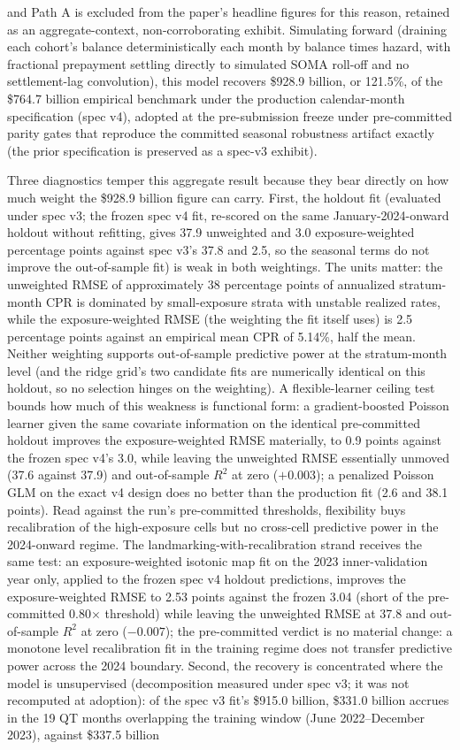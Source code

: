 \documentclass[12pt]{article}
\begin{document}
and Path A is excluded from the paper's headline figures for this reason, retained as an aggregate-context, non-corroborating exhibit. Simulating forward (draining each cohort's balance deterministically each month by balance times hazard, with fractional prepayment settling directly to simulated SOMA roll-off and no settlement-lag convolution), this model recovers \$928.9 billion, or 121.5\%, of the \$764.7 billion empirical benchmark under the production calendar-month specification (spec v4), adopted at the pre-submission freeze under pre-committed parity gates that reproduce the committed seasonal robustness artifact exactly (the prior specification is preserved as a spec-v3 exhibit).

Three diagnostics temper this aggregate result because they bear directly on how much weight the \$928.9 billion figure can carry. First, the holdout fit (evaluated under spec v3; the frozen spec v4 fit, re-scored on the same January-2024-onward holdout without refitting, gives 37.9 unweighted and 3.0 exposure-weighted percentage points against spec v3's 37.8 and 2.5, so the seasonal terms do not improve the out-of-sample fit) is weak in both weightings. The units matter: the unweighted RMSE of approximately 38 percentage points of annualized stratum-month CPR is dominated by small-exposure strata with unstable realized rates, while the exposure-weighted RMSE (the weighting the fit itself uses) is 2.5 percentage points against an empirical mean CPR of 5.14\%, half the mean. Neither weighting supports out-of-sample predictive power at the stratum-month level (and the ridge grid's two candidate fits are numerically identical on this holdout, so no selection hinges on the weighting). A flexible-learner ceiling test bounds how much of this weakness is functional form: a gradient-boosted Poisson learner given the same covariate information on the identical pre-committed holdout improves the exposure-weighted RMSE materially, to 0.9 points against the frozen spec v4's 3.0, while leaving the unweighted RMSE essentially unmoved (37.6 against 37.9) and out-of-sample $R^2$ at zero ($+0.003$); a penalized Poisson GLM on the exact v4 design does no better than the production fit (2.6 and 38.1 points). Read against the run's pre-committed thresholds, flexibility buys recalibration of the high-exposure cells but no cross-cell predictive power in the 2024-onward regime. The landmarking-with-recalibration strand receives the same test: an exposure-weighted isotonic map fit on the 2023 inner-validation year only, applied to the frozen spec v4 holdout predictions, improves the exposure-weighted RMSE to 2.53 points against the frozen 3.04 (short of the pre-committed 0.80$\times$ threshold) while leaving the unweighted RMSE at 37.8 and out-of-sample $R^2$ at zero ($-0.007$); the pre-committed verdict is no material change: a monotone level recalibration fit in the training regime does not transfer predictive power across the 2024 boundary. Second, the recovery is concentrated where the model is unsupervised (decomposition measured under spec v3; it was not recomputed at adoption): of the spec v3 fit's \$915.0 billion, \$331.0 billion accrues in the 19 QT months overlapping the training window (June 2022--December 2023), against \$337.5 billion 
\end{document}
